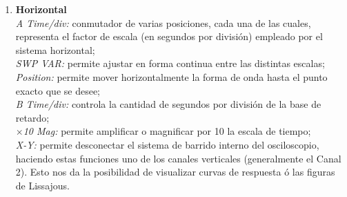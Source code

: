 \documentclass{article}
\begin{document}
\begin{enumerate}
	\item \textbf{Horizontal} \bigskip \\ 
		  \textit{A Time/div:} conmutador de varias posiciones, cada una de las cuales, representa el factor de escala (en segundos por división) empleado por el sistema horizontal; \medskip \\
		  \textit{SWP VAR:} permite ajustar en forma continua entre las distintas escalas; \medskip \\
		  \textit{Position:} permite mover horizontalmente la forma de
onda hasta el punto exacto que se desee; \medskip \\
		  \textit{B Time/div:} controla la cantidad de segundos por división de la base de retardo; \medskip \\
		  \textit{$\times$10 Mag:} permite amplificar o magnificar por 10 la escala de tiempo; \medskip \\
		  \textit{X-Y:} permite desconectar el sistema de barrido interno del osciloscopio, haciendo estas funciones uno de los canales verticales (generalmente el Canal 2). Esto nos da la posibilidad de visualizar curvas de respuesta ó las figuras de Lissajous. \medskip \\


\end{enumerate}
\end{document}
